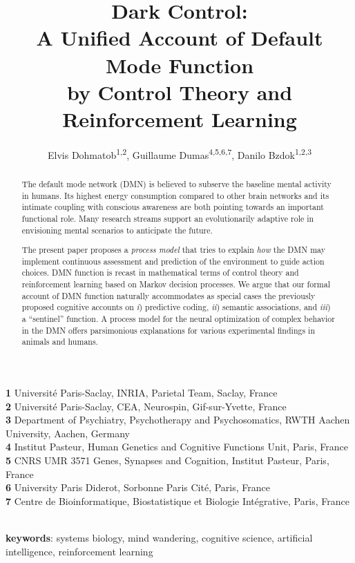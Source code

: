\documentclass[10pt,letterpaper]{article}
\date{}
\title{Dark Control:\\
       A Unified Account of Default Mode Function\\
       by Control Theory and Reinforcement Learning}
\begin{document}
\author{Elvis Dohmatob\textsuperscript{1,2}, Guillaume Dumas\textsuperscript{4,5,6,7}, Danilo Bzdok\textsuperscript{1,2,3}
}

\maketitle
\small{
    \textbf{1} Universit\'e Paris-Saclay, INRIA, Parietal Team, Saclay, France\\
    \textbf{2} Universit\'e Paris-Saclay, CEA, Neurospin, Gif-sur-Yvette, France\\
    \textbf{3} Department of Psychiatry, Psychotherapy and Psychosomatics, RWTH Aachen University, Aachen, Germany\\
    \textbf{4} Institut Pasteur, Human Genetics and Cognitive Functions Unit, Paris, France\\
    \textbf{5} CNRS UMR 3571 Genes, Synapses and Cognition, Institut Pasteur, Paris, France\\
    \textbf{6} University Paris Diderot, Sorbonne Paris Cit\'e, Paris, France\\
    \textbf{7} Centre de Bioinformatique, Biostatistique et Biologie Intégrative, Paris, France
}

\begin{abstract}
The default mode network (DMN) is believed to subserve the
baseline mental activity in humans.
%
Its highest energy consumption compared to other brain networks and
its intimate coupling with conscious awareness are both pointing towards
an important functional role.
%
Many research streams support an evolutionarily adaptive role in
envisioning mental scenarios to anticipate the future.


The present paper proposes a \textit{process model}
that tries to explain \textit{how}
the DMN may implement
continuous assessment and prediction of the environment to guide action choices.
%
DMN function is recast in mathematical terms of
control theory and reinforcement learning based on Markov decision processes.
%
We argue that our formal account of DMN function naturally accommodates as special cases
the previously proposed cognitive accounts on
\textit{i}) predictive coding,
\textit{ii}) semantic associations, and
\textit{iii}) a ``sentinel'' function.
%
A process model for the neural optimization of complex behavior in the DMN
offers parsimonious explanations for
various experimental findings in animals and humans.
\end{abstract}

\textbf{\\keywords}: systems biology, mind wandering, cognitive science,
artificial intelligence,
reinforcement learning
\end{document}
